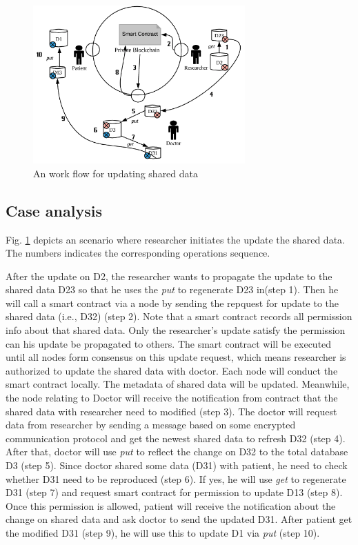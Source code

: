 \documentclass[conference]{IEEEtran}
\begin{document}
\begin{figure}[htbp]
	\centerline{\includegraphics[width=230pt]{updateScenario.png}}
	\caption{An work flow for updating shared data}
	\label{workflow}
\end{figure}

\subsection{Case analysis}
Fig. \ref{workflow} depicts an scenario where researcher initiates the update the shared data. The numbers indicates the corresponding operations sequence.

After the update on D2, the researcher wants to propagate the update to the shared data D23 so that he uses the \emph{put} to regenerate D23 in(step 1). Then he will call a smart contract via a node by sending the repquest for update to the shared data (i.e., D32) (step 2). Note that a smart contract records all permission info about that shared data. Only the researcher's update satisfy the permission can his update be propagated to others. The smart contract will be executed until all nodes form consensus on this update request, which means researcher is authorized to update the shared data with doctor. Each node will conduct the smart contract locally. The metadata of shared data will be updated. Meanwhile, the node relating to Doctor will receive the notification from contract that the shared data with researcher need to modified (step 3). The doctor will request data from researcher by sending a message based on some encrypted communication protocol and get the newest shared data to refresh D32 (step 4). After that, doctor will use \emph{put} to reflect the change on D32 to the total database D3 (step 5). Since doctor shared some data (D31) with patient, he need to check whether D31 need to be reproduced (step 6). If yes, he will use \emph{get} to regenerate D31 (step 7) and request smart contract for permission to update D13 (step 8). Once this permission is allowed, patient will receive the notification about the change on shared data and ask doctor to send the updated D31. After patient get the modified D31 (step 9), he will use this to update D1 via \emph{put} (step 10).  
\end{document}
